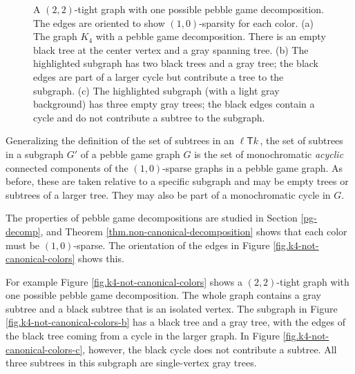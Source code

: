 \documentclass[11pt]{article}
\newcommand{\ellteekay}{\ensuremath{\ell{\mathsf T}k}\,}
\newcommand{\reffig}[1]{Figure \ref{fig.#1}}
\newcommand{\refthm}[1]{Theorem \ref{thm.#1}}
\begin{document}
	\begin{figure}[htbp]
		\centering
		\hspace{.3in}
		\hspace{.3in}
		\caption{A $(2,2)$-tight graph with one possible pebble game decomposition.  The edges are oriented
		to show $(1,0)$-sparsity for each color.  (a) The graph $K_4$ with a pebble game decomposition.
		There is an empty black tree at the center vertex and a gray spanning tree.  (b) The highlighted
		subgraph has two black trees and a gray tree; the black edges are part of a larger cycle but 
		contribute a tree to the subgraph.  (c) The highlighted subgraph (with a light gray background)
		has three empty gray trees;
		the black edges contain a cycle and do not contribute a subtree to the subgraph.}
	\end{figure}
	
	Generalizing the definition of the set of subtrees in an \ellteekay, the 
	set of subtrees in a subgraph $G'$ of a pebble game graph $G$ is the 
	set of monochromatic {\it acyclic} connected components of the 
	$(1,0)$-sparse graphs in a pebble game graph.  As before, these are taken 
	relative to a specific subgraph and  may
	be empty trees or subtrees of a larger tree.  They may also be part of a
	monochromatic cycle in $G$.  
	
	
	The properties of pebble game decompositions are studied in Section \ref{pg-decomp},
	and \refthm{non-canonical-decomposition} shows that each color must be $(1,0)$-sparse.
	The orientation of the edges in \reffig{k4-not-canonical-colors} shows 
	this.
	
	For example \reffig{k4-not-canonical-colors} shows a $(2,2)$-tight graph with one 
	possible pebble game decomposition.  The whole graph contains a gray subtree and a
	black subtree that is an isolated vertex.  The subgraph in \reffig{k4-not-canonical-colors-b}
	has a black tree and a gray tree, with the edges of the black tree coming from a cycle in the larger
	graph.  In \reffig{k4-not-canonical-colors-c}, however, the black cycle does not contribute a 
	subtree.  All three subtrees in this subgraph are single-vertex gray trees.
	
\end{document}
